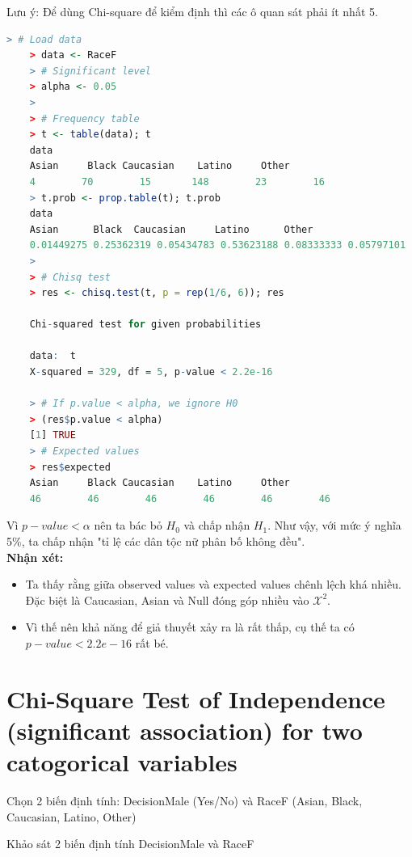 \documentclass[a4paper,12pt]{article}
\begin{document}
	Lưu ý: Để dùng Chi-square để kiểm định thì các ô quan sát phải ít nhất 5.
	
	\begin{lstlisting}[language=R]
	> # Load data
	> data <- RaceF
	> # Significant level
	> alpha <- 0.05
	> 
	> # Frequency table
	> t <- table(data); t
	data
	Asian     Black Caucasian    Latino     Other 
	4        70        15       148        23        16 
	> t.prob <- prop.table(t); t.prob
	data
	Asian      Black  Caucasian     Latino      Other 
	0.01449275 0.25362319 0.05434783 0.53623188 0.08333333 0.05797101 
	> 
	> # Chisq test
	> res <- chisq.test(t, p = rep(1/6, 6)); res
	
	Chi-squared test for given probabilities
	
	data:  t
	X-squared = 329, df = 5, p-value < 2.2e-16
	
	> # If p.value < alpha, we ignore H0
	> (res$p.value < alpha)
	[1] TRUE
	> # Expected values
	> res$expected
	Asian     Black Caucasian    Latino     Other 
	46        46        46        46        46        46 
	\end{lstlisting}
	
	Vì $p-value < \alpha$ nên ta bác bỏ $H_0$ và chấp nhận $H_1$. Như vậy, với mức ý nghĩa 5\%, ta chấp nhận "tỉ lệ các dân tộc nữ phân bố không đều".\\
	
	
	\textbf{Nhận xét:}
	\begin{itemize}
		\item Ta thấy rằng giữa observed values và expected values chênh lệch khá nhiều. Đặc biệt là Caucasian, Asian và Null đóng góp nhiều vào $\mathcal{X}^2$.
		\item Vì thế nên khả năng để giả thuyết xảy ra là rất thấp, cụ thế ta có $p-value < 2.2e-16$ rất bé.
	\end{itemize}
		
	\section{Chi-Square Test of Independence (significant association) for two catogorical variables}
	Chọn 2 biến định tính: DecisionMale (Yes/No) và RaceF (Asian, Black, Caucasian, Latino, Other)
	
	Khảo sát 2 biến định tính DecisionMale và RaceF
	
\end{document}
